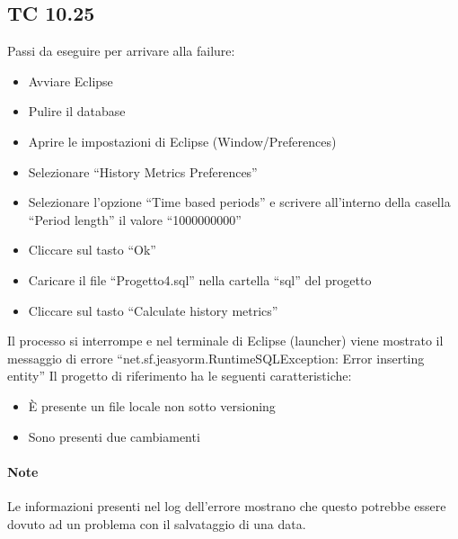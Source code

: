 \subsection*{TC 10.25}
Passi da eseguire per arrivare alla failure:
\begin{itemize}
 \item Avviare Eclipse
 \item Pulire il database
 \item Aprire le impostazioni di Eclipse (Window/Preferences)
 \item Selezionare ``History Metrics Preferences''
 \item Selezionare l'opzione ``Time based periods'' e scrivere all'interno della casella ``Period length'' il valore ``1000000000''
 \item Cliccare sul tasto ``Ok''
 \item Caricare il file ``Progetto4.sql'' nella cartella ``sql'' del progetto
 \item Cliccare sul tasto ``Calculate history metrics''
\end{itemize}
Il processo si interrompe e nel terminale di Eclipse (launcher) viene mostrato il messaggio di errore ``net.sf.jeasyorm.RuntimeSQLException: Error inserting entity''
\newline
Il progetto di riferimento ha le seguenti caratteristiche:
\begin{itemize}
 \item È presente un file locale non sotto versioning
 \item Sono presenti due cambiamenti
\end{itemize}

\paragraph{Note} Le informazioni presenti nel log dell'errore mostrano che questo potrebbe essere dovuto ad un problema con il salvataggio di una data.





\newpage






